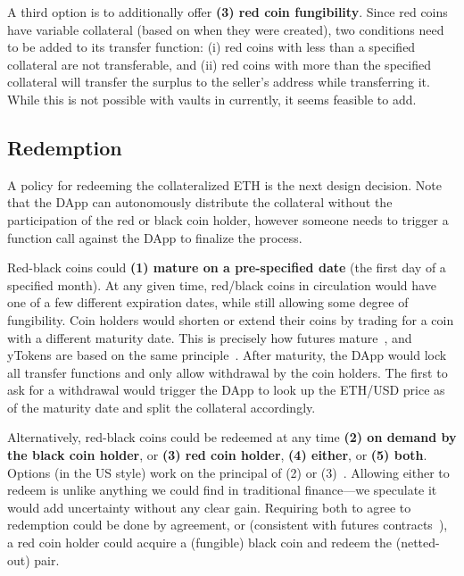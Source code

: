 A third option is to additionally offer \textbf{(3) red coin fungibility}. Since red coins have variable collateral (based on when they were created), two conditions need to be added to its transfer function: (i) red coins with less than a specified collateral are not transferable, and (ii) red coins with more than the specified collateral will transfer the surplus to the seller’s address while transferring it. While this is not possible with vaults in \dai currently, it seems feasible to add.
	

\subsection{Redemption}
\label{sec:maturity}

A policy for redeeming the collateralized ETH is the next design decision. Note that the DApp can autonomously distribute the collateral without the participation of the red or black coin holder, however someone needs to trigger a function call against the DApp to finalize the process.

 Red-black coins could \textbf{(1) mature on a pre-specified date} (\eg the first day of a specified month). At any given time, red/black coins in circulation would have one of a few different expiration dates, while still allowing some degree of fungibility. Coin holders would shorten or extend their coins by trading for a coin with a different maturity date. This is precisely how futures  mature~\cite{Har03}, and yTokens are based on the same principle~\cite{RoNi20}. After maturity, the DApp would lock all transfer functions and only allow withdrawal by the coin holders. The first to ask for a withdrawal would trigger the DApp to look up the ETH/USD price as of the maturity date and split the collateral accordingly. 

Alternatively, red-black coins could be redeemed at any time \textbf{(2) on demand by the black coin holder}, or \textbf{(3) red coin holder}, \textbf{(4) either}, or \textbf{(5) both}. Options (in the US style) work on the principal of (2) or (3)~\cite{Har03,Sey09}. Allowing either to redeem is unlike anything we could find in traditional finance---we speculate it would add uncertainty without any clear gain. Requiring both to agree to redemption could be done by agreement, or (consistent with futures contracts~\cite{Har03}), a red coin holder could acquire a (fungible) black coin and redeem the (netted-out) pair.

